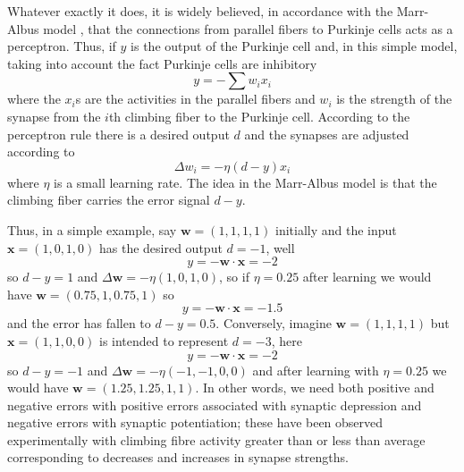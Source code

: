 \documentclass[11pt,a4paper]{scrartcl}
\begin{document}
Whatever exactly it does, it is widely believed, in accordance with
the Marr-Albus model \cite{Marr1969a,Albus1971a}, that the connections
from parallel fibers to Purkinje cells acts as a perceptron. Thus, if
$y$ is the output of the Purkinje cell and, in this simple model,
taking into account the fact Purkinje cells are inhibitory
\begin{equation}
y=-\sum{w_ix_i}
\end{equation}
where the $x_i$s are the activities in the parallel fibers and $w_i$
is the strength of the synapse from the $i$th climbing fiber to the
Purkinje cell. According to the perceptron rule there is a desired output $d$ and the synapses are adjusted according to
\begin{equation}
\Delta w_i=-\eta (d-y)x_i
\end{equation}
where $\eta$ is a small learning rate. The idea in the Marr-Albus
model is that the climbing fiber carries the error signal $d-y$.

Thus, in a simple example, say $\mathbf{w}=(1,1,1,1)$ initially and
the input $\mathbf{x}=(1,0,1,0)$ has the desired output $d=-1$, well
\begin{equation}
y=-\mathbf{w}\cdot\mathbf{x}=-2
\end{equation}
so $d-y=1$ and $\Delta\mathbf{w}=-\eta(1,0,1,0)$, so if $\eta=0.25$ after learning we would have $\mathbf{w}=(0.75,1,0.75,1)$ so
\begin{equation}
y=-\mathbf{w}\cdot\mathbf{x}=-1.5
\end{equation}
and the error has fallen to $d-y=0.5$. Conversely, imagine
$\mathbf{w}=(1,1,1,1)$ but $\mathbf{x}=(1,1,0,0)$ is intended to
represent $d=-3$, here
\begin{equation}
y=-\mathbf{w}\cdot\mathbf{x}=-2
\end{equation}
so $d-y=-1$ and $\Delta\mathbf{w}=-\eta(-1,-1,0,0)$ and after learning
with $\eta=0.25$ we would have $\mathbf{w}=(1.25,1.25,1,1)$. In other
words, we need both positive and negative errors with positive errors
associated with synaptic depression and negative errors with synaptic
potentiation; these have been observed experimentally
\cite{ItoEtAl1982a,DeanEtAl2010a} with climbing fibre activity greater
than or less than average corresponding to decreases and increases in
synapse strengths.
\end{document}

